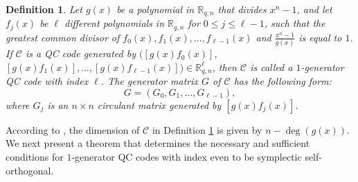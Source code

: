 \documentclass[journal]{IEEEtran}
\newtheorem{definition}{Definition}
\begin{document}

\begin{definition}\label{one_quasi-cyclic_def}
	Let $g(x)$ be a polynomial in $\mathbb{R}_{q,n}$ that divides ${{x}^{n}}-1$, and let $f_{j}(x)$ be $\ell$ different polynomials in $\mathbb{R}_{q,n}$ for $0\le j\le \ell-1$, such that the greatest common divisor of $f_0(x),f_1(x),\ldots,f_{\ell-1}(x)$ and $\frac{x^n-1}{g(x)}$ is equal to $1$. 
	If $\mathscr{C}$ is a QC code generated by $(\left[g(x){f}_{0}(x)\right]$, $\left[g(x){f}_{1}(x)\right],\ldots,\left[g(x){f}_{\ell -1}(x)\right]) \in \mathbb{R}_{q,n}^{\ell} $, then $\mathscr{C}$ is called a $1$-generator QC code with index $\ell$.
	The generator matrix $G$ of $\mathscr{C}$  has the following form:
	\begin{equation}
		G=\left(G_{0}, G_{1}, \ldots, G_{\ell-1}\right) ,
	\end{equation}
	where $G_ {j} $ is an $n\times n$  circulant matrix generated by $\left[g (x) f_{j} (x)\right]$.
\end{definition}

According to \cite{aydin2001structure}, the dimension of $\mathscr{C}$ in Definition \ref{one_quasi-cyclic_def} is given by $n-\deg(g (x))$.
We next present a theorem that determines the necessary and sufficient conditions for $1$-generator QC codes with index even to be symplectic self-orthogonal.
\end{document}
